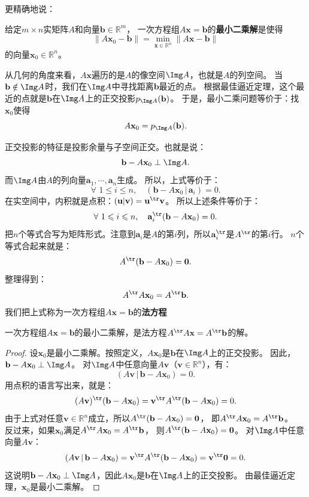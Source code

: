 \documentclass[12pt,UTF8]{ctexbook}
\begin{document}
更精确地说：
\begin{df}\label{df:7_5}
给定$m \times n$实矩阵$A$和向量$\mathbf{b} \in \mathbb{R}^m$，
一次方程组$A\mathbf{x} = \mathbf{b}$的\textbf{最小二乘解}是使得
$$ \|A\mathbf{x}_0 - \mathbf{b}\| = \min_{\mathbf{x} \in \mathbb{R}^n} \|A\mathbf{x} - \mathbf{b}\| $$
的向量$\mathbf{x}_0 \in \mathbb{R}^n$。
\end{df}

从几何的角度来看，$A\mathbf{x}$遍历的是$A$的像空间$\Img A$，也就是$A$的列空间。
当$\mathbf{b} \notin \Img A$时，我们在$\Img A$中寻找距离$\mathbf{b}$最近的点。
根据最佳逼近定理，这个最近的点就是$\mathbf{b}$在$\Img A$上的正交投影$p_{\Img A}(\mathbf{b})$。
于是，最小二乘问题等价于：找$\mathbf{x}_0$使得
$$ A\mathbf{x}_0 = p_{\Img A}(\mathbf{b}). $$

正交投影的特征是投影余量与子空间正交。也就是说：
$$ \mathbf{b} - A\mathbf{x}_0 \perp \Img A. $$
而$\Img A$由$A$的列向量$\mathbf{a}_1, \cdots, \mathbf{a}_n$生成。
所以，上式等价于：
$$ \forall \,\, 1 \leqslant i \leqslant n, \quad (\mathbf{b} - A\mathbf{x}_0 \,|\, \mathbf{a}_i) = 0. $$
在实空间中，内积就是点积：$(\mathbf{u}|\mathbf{v}) = \mathbf{u}^{\tr}\mathbf{v}$。
所以上述条件等价于：
$$ \forall \,\, 1 \leqslant i \leqslant n, \quad \mathbf{a}_i^{\tr}(\mathbf{b} - A\mathbf{x}_0) = 0. $$
把$n$个等式合写为矩阵形式。注意到$\mathbf{a}_i$是$A$的第$i$列，所以$\mathbf{a}_i^{\tr}$是$A^{\tr}$的第$i$行。
$n$个等式合起来就是：
$$ A^{\tr}(\mathbf{b} - A\mathbf{x}_0) = \mathbf{0}. $$
整理得到：
$$ A^{\tr} A \mathbf{x}_0 = A^{\tr} \mathbf{b}. $$
我们把上式称为一次方程组$A\mathbf{x} = \mathbf{b}$的\textbf{法方程}

\begin{pp}\label{pp:7_10}
一次方程组$A\mathbf{x} = \mathbf{b}$的最小二乘解，是法方程$A^{\tr} A \mathbf{x} = A^{\tr} \mathbf{b}$的解。
\end{pp}

\begin{proof} %
设$\mathbf{x}_0$是最小二乘解。按照定义，$A\mathbf{x}_0$是$\mathbf{b}$在$\Img A$上的正交投影。
因此，$\mathbf{b} - A\mathbf{x}_0 \perp \Img A$。
对$\Img A$中任意向量$A\mathbf{v}$（$\mathbf{v} \in \mathbb{R}^n$），有：
$$ (A\mathbf{v} \,|\, \mathbf{b} - A\mathbf{x}_0) = 0. $$
用点积的语言写出来，就是：
$$ (A\mathbf{v})^{\tr}(\mathbf{b} - A\mathbf{x}_0) = \mathbf{v}^{\tr} A^{\tr}(\mathbf{b} - A\mathbf{x}_0) = 0. $$
由于上式对任意$\mathbf{v} \in \mathbb{R}^n$成立，所以$A^{\tr}(\mathbf{b} - A\mathbf{x}_0) = \mathbf{0}$，
即$A^{\tr} A \mathbf{x}_0 = A^{\tr} \mathbf{b}$。\\
反过来，如果$\mathbf{x}_0$满足$A^{\tr} A \mathbf{x}_0 = A^{\tr} \mathbf{b}$，
则$A^{\tr}(\mathbf{b} - A\mathbf{x}_0) = \mathbf{0}$。
对$\Img A$中任意向量$A\mathbf{v}$：
$$ (A\mathbf{v} \,|\, \mathbf{b} - A\mathbf{x}_0) = \mathbf{v}^{\tr} A^{\tr}(\mathbf{b} - A\mathbf{x}_0) = \mathbf{v}^{\tr} \mathbf{0} = 0. $$
这说明$\mathbf{b} - A\mathbf{x}_0 \perp \Img A$，因此$A\mathbf{x}_0$是$\mathbf{b}$在$\Img A$上的正交投影。
由最佳逼近定理，$\mathbf{x}_0$是最小二乘解。
\end{proof}
\end{document}
